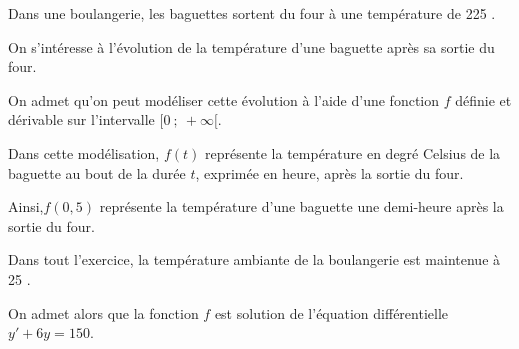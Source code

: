 
\medskip


\medskip

Dans une boulangerie, les baguettes sortent du four à une température de 225 \textcelsius.

On s’intéresse à l’évolution de la température d’une baguette après sa sortie du four.

On admet qu’on peut modéliser cette évolution à l’aide d’une fonction $f$ définie et dérivable sur l’intervalle $[0~;~+\infty[$.

 Dans cette modélisation, $f(t)$ représente la température en degré Celsius de la baguette au bout de la durée $t$, exprimée en heure, après la sortie du four.

Ainsi,$f(0,5)$ représente la température d’une baguette une demi-heure après la sortie du four.

Dans tout l’exercice, la température ambiante de la boulangerie est maintenue à 25 \textcelsius.

On admet alors que la fonction $f$ est solution de l'équation différentielle $y'+ 6y = 150$.

\medskip

